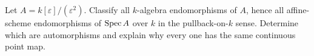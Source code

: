 \begin{problem}\label{chal:vi19-c02}
Let $A=k[\varepsilon]/(\varepsilon^2)$. Classify all $k$-algebra endomorphisms of $A$, hence all affine-scheme endomorphisms of $\operatorname{Spec} A$ over $k$ in the pullback-on-$k$ sense.  Determine which are automorphisms and explain why every one has the same continuous point map.
\end{problem}

